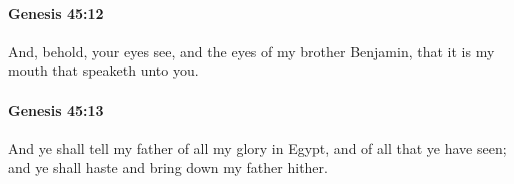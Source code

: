 		\paragraph{Genesis 45:12} %
			\label{GENESIS-45-12}

			And, behold, your eyes see, and the eyes of my brother Benjamin, that it is my mouth that speaketh unto you.


		\paragraph{Genesis 45:13} %
			\label{GENESIS-45-13}

			And ye shall tell my father of all my glory in Egypt, and of all that ye have seen; and ye shall haste and bring down my father hither.


